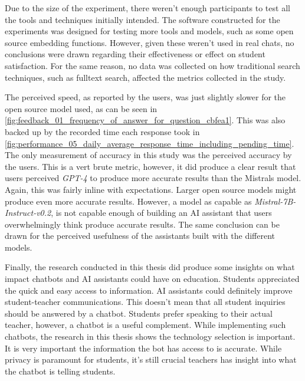 

Due to the size of the experiment, there weren't enough participants to test all the tools and techniques initially intended. The software constructed for the experiments was designed for testing more tools and models, such as some open source embedding functions. However, given these weren’t used in real chats, no conclusions were drawn regarding their effectiveness or effect on student satisfaction. For the same reason, no data was collected on how traditional search techniques, such as fulltext search, affected the metrics collected in the study.




The perceived speed, as reported by the users, was just slightly slower for the open source model used, as can be seen in \autoref{fig:feedback_01_frequency_of_answer_for_question_cbfea1}. This was also backed up by the recorded time each response took in \autoref{fig:performance_05_daily_average_response_time_including_pending_time}. The only measurement of accuracy in this study was the perceived accuracy by the users. This is a vert brute metric, however, it did produce a clear result that users perceived \textit{GPT-4} to produce more accurate results than the Mistrals model. Again, this was fairly inline with expectations. Larger open source models might produce even more accurate results. However, a model as capable as \textit{Mistral-7B-Instruct-v0.2}, is not capable enough of building an AI assistant that users overwhelmingly think produce accurate results. The same conclusion can be drawn for the perceived usefulness of the assistants built with the different models.




Finally, the research conducted in this thesis did produce some insights on what impact chatbots and AI assistants could have on education. Students appreciated the quick and easy access to information. AI assistants could definitely improve student-teacher communications. This doesn’t mean that all student inquiries should be answered by a chatbot. Students prefer speaking to their actual teacher, however, a chatbot is a useful complement. While implementing such chatbots, the research in this thesis shows the technology selection is important. It is very important the information the bot has access to is accurate. While privacy is paramount for students, it’s still crucial teachers has insight into what the chatbot is telling students.


